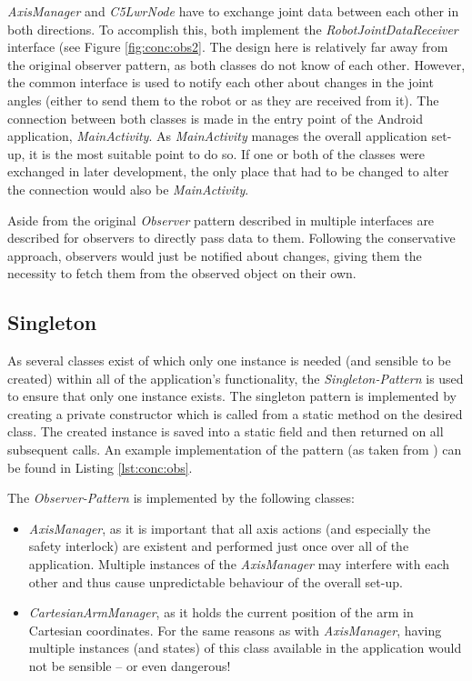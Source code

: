\textit{AxisManager} and \textit{C5LwrNode} have to exchange joint data between each other in both directions. To accomplish this, both implement the \textit{RobotJointDataReceiver} interface (see Figure \ref{fig:conc:obs2}. The design here is relatively far away from the original observer pattern, as both classes do not know of each other. However, the common interface is used to notify each other about changes in the joint angles (either to send them to the robot or as they are received from it). The connection between both classes is made in the entry point of the Android application, \textit{MainActivity}. As \textit{MainActivity} manages the overall application set-up, it is the most suitable point to do so. If one or both of the classes were exchanged in later development, the only place that had to be changed to alter the connection would also be \textit{MainActivity}.

Aside from the original \textit{Observer} pattern described in \cite{Eilebrecht2013} multiple interfaces are described for observers to directly pass data to them. Following the conservative approach, observers would just be notified about changes, giving them the necessity to fetch them from the observed object on their own.

\subsection{Singleton}

As several classes exist of which only one instance is needed (and sensible to be created) within all of the application's functionality, the \textit{Singleton-Pattern} is used to ensure that only one instance exists. The singleton pattern is implemented by creating a private constructor which is called from a static method on the desired class. The created instance is saved into a static field and then returned on all subsequent calls. An example implementation of the pattern (as taken from \cite{Eilebrecht2013}) can be found in Listing \ref{lst:conc:obs}.

The \textit{Observer-Pattern} is implemented by the following classes:
\begin{itemize}
	\item \textit{AxisManager}, as it is important that all axis actions (and especially the safety interlock) are existent and performed just once over all of the application. Multiple instances of the \textit{AxisManager} may interfere with each other and thus cause unpredictable behaviour of the overall set-up.
	\item \textit{CartesianArmManager}, as it holds the current position of the arm in Cartesian coordinates. For the same reasons as with \textit{AxisManager}, having multiple instances (and states) of this class available in the application would not be sensible -- or even dangerous!
\end{itemize}


